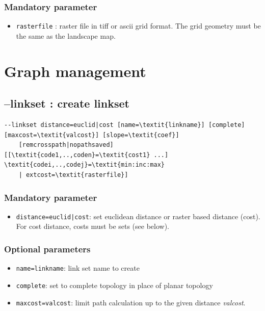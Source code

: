 \documentclass[a4paper,10pt]{report}
\begin{document}
\subsubsection{Mandatory parameter}
\begin{itemize}
	\item \verb|rasterfile| : raster file in tiff or ascii grid format. The grid geometry must be the same as the landscape map.
\end{itemize}

\section{Graph management}

\subsection{--linkset : create linkset}
\begin{Verbatim}[commandchars=\\\{\}]
--linkset distance=euclid|cost [name=\textit{linkname}] [complete] [maxcost=\textit{valcost}] [slope=\textit{coef}]
	[remcrosspath|nopathsaved] [[\textit{code1,..,coden}=\textit{cost1} ...] \textit{codei,..,codej}=\textit{min:inc:max} 
	| extcost=\textit{rasterfile}]
\end{Verbatim}

\subsubsection{Mandatory parameter}
\begin{itemize}
	\item \verb-distance=euclid|cost-: set euclidean distance or raster based distance (cost). For cost distance, costs must be sets (see below).
\end{itemize}

\subsubsection{Optional parameters}
\begin{itemize}
	\item \verb|name=linkname|: link set name to create
	\item \verb|complete|: set to complete topology in place of planar topology
	\item \verb|maxcost=valcost|: limit path calculation up to the given distance \textit{valcost}.
\end{itemize}
\end{document}
